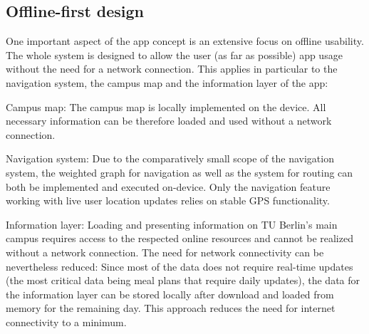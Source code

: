 \subsection{Offline-first design}
One important aspect of the app concept is an extensive focus on offline usability. The whole system is designed to allow the user (as far as possible) app usage without the need for a network connection. This applies in particular to the navigation system, the campus map and the information layer of the app:

Campus map: The campus map is locally implemented on the device. All necessary information can be therefore loaded and used without a network connection.

Navigation system: Due to the comparatively small scope of the navigation system, the weighted graph for navigation as well as the system for routing can both be implemented and executed on-device. Only the navigation feature working with live user location updates relies on stable GPS functionality.

Information layer: Loading and presenting information on TU Berlin's main campus requires access to the respected online resources and cannot be realized without a network connection. The need for network connectivity can be nevertheless reduced: Since most of the data does not require real-time updates (the most critical data being meal plans that require daily updates), the data for the information layer can be stored locally after download and loaded from memory for the remaining day. This approach reduces the need for internet connectivity to a minimum.


